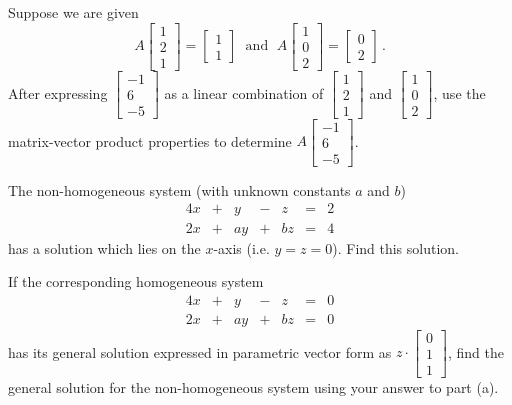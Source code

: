 \item Suppose we are given 
\[ A \left[ \begin{array}{c} 1 \\ 2\\ 1 \end{array} \right] = \left[ \begin{array}{c} 1 \\ 1 \end{array} \right] \; \text{ and } \; A \left[ \begin{array}{c} 1 \\ 0 \\2  \end{array} \right] = \left[ \begin{array}{c} 0 \\ 2 \end{array} \right] \, .\]
After expressing $\left[ \begin{array}{r} -1 \\ 6 \\ -5 \end{array} \right]$ as a linear combination of $\left[ \begin{array}{c} 1 \\ 2\\ 1 \end{array} \right]$ and $\left[ \begin{array}{c} 1 \\ 0 \\2  \end{array} \right]$, use the matrix-vector product properties to determine $A\left[ \begin{array}{r} -1 \\ 6 \\ -5 \end{array} \right]$. 

\item 
	\ba
	\item The non-homogeneous system (with unknown constants $a$ and $b$)
\begin{alignat*}{4}
{}x 	&{}+{} 	&{}y 	&{}-{}	&{}z		&{}={}	&2 \\
{2}x 	&{}+{} 	&{a}y 	&{}+{}	&{b}z	&{}={}	&4
\end{alignat*} 
has a solution which lies on the $x$-axis (i.e. $y=z=0$). Find this solution.

	\item If the corresponding homogeneous system
\begin{alignat*}{4}
{}x 	&{}+{} 	&{}y 	&{}-{}	&{}z		&{}={}	&0 \\
{2}x 	&{}+{} 	&{a}y 	&{}+{}	&{b}z	&{}={}	&0
\end{alignat*} 
has its general solution expressed in parametric vector form as $z\cdot \left[ \begin{array}{c} 0\\1\\1 \end{array} \right]$, find the general solution for the non-homogeneous system using your answer to part (a).

